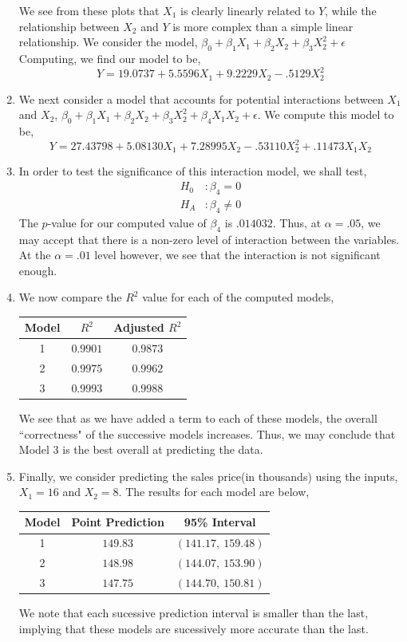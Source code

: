 \documentclass[letterpaper,10pt]{article}
\begin{document}
\begin{enumerate}
\begin{center}
\end{center}
We see from these plots that $X_1$ is clearly linearly related to $Y$, while the relationship between $X_2$ and $Y$ is more complex than a simple linear relationship. We consider the model, $\beta_0+\beta_1X_1+\beta_2X_2+\beta_3X_2^2+\epsilon$ Computing, we find our model to be,
\[Y=19.0737+5.5596X_1+9.2229X_2-.5129X_2^2\]
\item We next consider a model that accounts for potential interactions between $X_1$ and $X_2$, $\beta_0+\beta_1X_1+\beta_2X_2+\beta_3X_2^2+\beta_4X_1X_2+\epsilon$. We compute this model to be,
\[Y=27.43798+5.08130X_1+7.28995X_2-.53110X_2^2+.11473X_1X_2\]
\item In order to test the significance of this interaction model, we shall test,
\begin{align*}
H_0&: \beta_4 = 0\\
H_A&: \beta_4 \neq 0
\end{align*}
The $p$-value for our computed value of $\beta_4$ is $.014032$. Thus, at $\alpha=.05$, we may accept that there is a non-zero level of interaction between the variables. At the $\alpha=.01$ level however, we see that the interaction is not significant enough.
\item We now compare the $R^2$ value for each of the computed models,
\begin{center}
\begin{tabular}{c|c|c}
Model & $R^2$ & Adjusted $R^2$ \\\hline
1 & $0.9901$ & $0.9873$ \\
2 & $0.9975$ & $0.9962$\\
3 & $0.9993$ & $0.9988$
\end{tabular}
\end{center}
We see that as we have added a term to each of these models, the overall ``correctness" of the successive models increases. Thus, we may conclude that Model 3 is the best overall at predicting the data.
\item Finally, we consider predicting the sales price(in thousands) using the inputs, $X_1=16$ and $X_2=8$. The results for each model are below,
\begin{center}
\begin{tabular}{c|c|c}
Model & Point Prediction & 95\% Interval\\\hline
1 & $149.83$ & $(141.17,\ 159.48)$ \\
2 & $148.98$ & $(144.07,\ 153.90)$ \\
3 & $147.75$ & $(144.70,\ 150.81)$
\end{tabular}
\end{center}
We note that each sucessive prediction interval is smaller than the last, implying that these models are sucessively more accurate than the last.
\end{enumerate}
\end{document}
